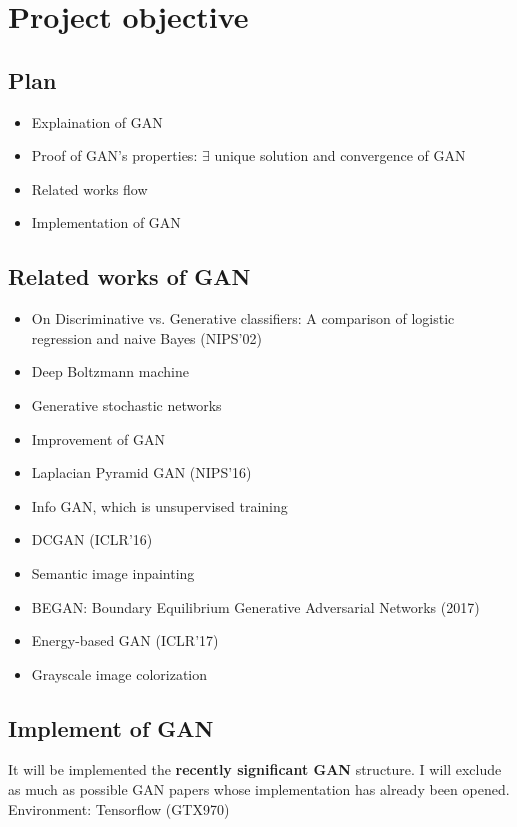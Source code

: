 \documentclass{article} %
\theoremstyle{definition}
\begin{document}
\section{Project objective}
\subsection{Plan}
\begin{itemize}
    \item Explaination of GAN
    \item Proof of GAN's properties: $\exists$ unique solution and convergence of GAN
    \item Related works flow
    \item Implementation of GAN
\end{itemize}

\subsection{Related works of GAN}

\begin{itemize}
    \item On Discriminative vs. Generative classifiers: A comparison of logistic regression and naive Bayes (NIPS'02) \cite{disc}
    \item Deep Boltzmann machine \cite{salakhutdinov2009deep}
    \item Generative stochastic networks \cite{bengio2014deep}
    \item Improvement of GAN \cite{SalimansGZCRC16}
    \item Laplacian Pyramid GAN (NIPS'16) \cite{denton2015deep}
    \item Info GAN, which is unsupervised training \cite{ChenDHSSA16}
    \item DCGAN (ICLR'16) \cite{radford2015unsupervised}
    \item Semantic image inpainting \cite{yeh2016semantic}
    \item BEGAN: Boundary Equilibrium Generative Adversarial Networks (2017) \cite{berthelot2017began}
    \item Energy-based GAN (ICLR'17) \cite{zhao2016energy}
    \item Grayscale image colorization \cite{cao2017unsupervised}
\end{itemize}

\subsection {Implement of GAN}
It will be implemented the \textbf{recently significant GAN} structure. I will exclude as much as possible GAN papers whose implementation has already been opened. Environment: Tensorflow (GTX970)
\printbibliography
\end{document}
